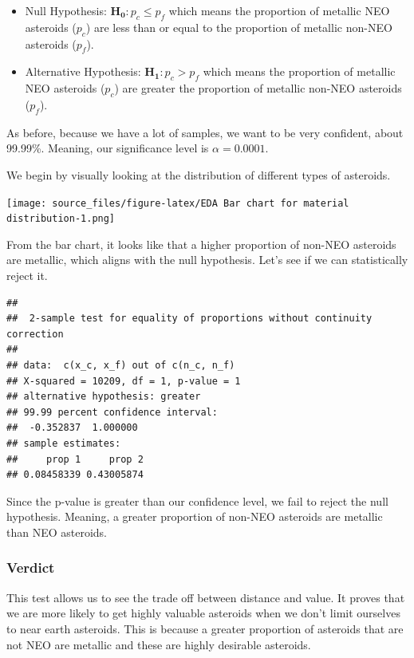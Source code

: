 \documentclass[
]{article}
\begin{document}
\begin{itemize}
\item
  Null Hypothesis: \(\mathbf{H_0}: p_c \le p_f\) which means the
  proportion of metallic NEO asteroids (\(p_c\)) are less than or equal
  to the proportion of metallic non-NEO asteroids (\(p_f\)).
\item
  Alternative Hypothesis: \(\mathbf{H_1}: p_c > p_f\) which means the
  proportion of metallic NEO asteroids (\(p_c\)) are greater the
  proportion of metallic non-NEO asteroids (\(p_f\)).
\end{itemize}

As before, because we have a lot of samples, we want to be very
confident, about 99.99\%. Meaning, our significance level is
\(\alpha = 0.0001\).

We begin by visually looking at the distribution of different types of
asteroids.

\texttt{[image: source\_files/figure-latex/EDA Bar chart for material distribution-1.png]}

From the bar chart, it looks like that a higher proportion of non-NEO
asteroids are metallic, which aligns with the null hypothesis. Let's see
if we can statistically reject it.

\begin{verbatim}
## 
##  2-sample test for equality of proportions without continuity correction
## 
## data:  c(x_c, x_f) out of c(n_c, n_f)
## X-squared = 10209, df = 1, p-value = 1
## alternative hypothesis: greater
## 99.99 percent confidence interval:
##  -0.352837  1.000000
## sample estimates:
##     prop 1     prop 2 
## 0.08458339 0.43005874
\end{verbatim}

Since the p-value is greater than our confidence level, we fail to
reject the null hypothesis. Meaning, a greater proportion of non-NEO
asteroids are metallic than NEO asteroids.

\hypertarget{verdict-1}{%
\subsubsection{Verdict}\label{verdict-1}}

This test allows us to see the trade off between distance and value. It
proves that we are more likely to get highly valuable asteroids when we
don't limit ourselves to near earth asteroids. This is because a greater
proportion of asteroids that are not NEO are metallic and these are
highly desirable asteroids.
\end{document}
